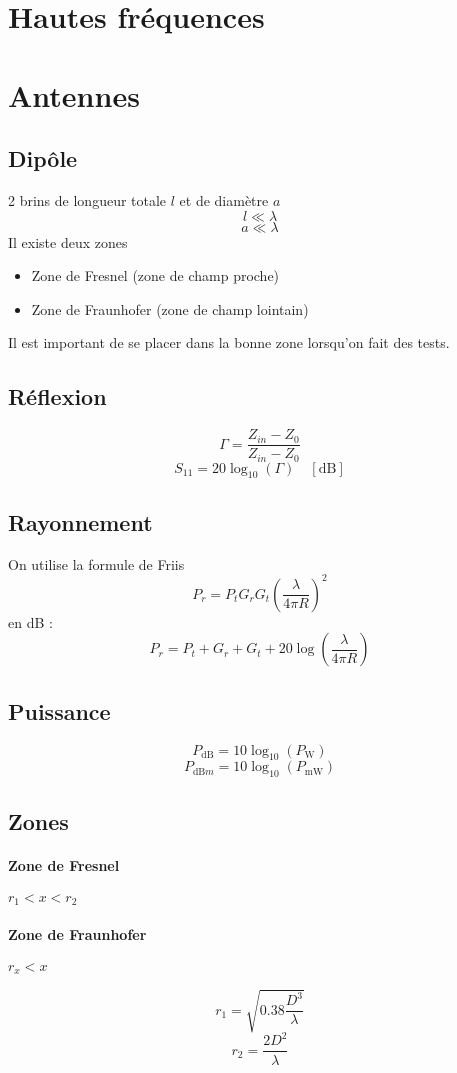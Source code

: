 \documentclass[resume]{subfiles}
\begin{document}
\section{Hautes fréquences}
\section{Antennes}
\subsection{Dipôle}
2 brins de longueur totale $l$ et de diamètre $a$
$$l\ll \lambda$$
$$a\ll\lambda$$
Il existe deux zones
\begin{itemize}
\item Zone de Fresnel (zone de champ proche)
\item Zone de Fraunhofer (zone de champ lointain)
\end{itemize}
Il est important de se placer dans la bonne zone lorsqu'on fait des tests.
\subsection{Réflexion}
$$\Gamma=\frac{Z_{in}-Z_0}{Z_{in}-Z_0}$$
$$S_{11}=20\log_{10}(\Gamma)\quad [\si{\deci\bel}]$$
\subsection{Rayonnement}
On utilise la formule de Friis
$$P_r=P_tG_rG_t\left(\frac{\lambda}{4\pi R}\right)^2$$
en dB :
$$P_r=P_t+G_r+G_t+20\log\left(\frac{\lambda}{4\pi R}\right)$$
\subsection{Puissance}
$$\boxed{P_{\si{\deci\bel}}=10\log_{10}\left(P_{\si{\watt}}\right)}$$
$$\boxed{P_{\si{\deci\bel m}}=10\log_{10}\left(P_{\si{\milli\watt}}\right)}$$
\subsection{Zones}
\paragraph{Zone de Fresnel} $r_1 < x < r_2$
\paragraph{Zone de Fraunhofer} $ r_x < x$

$$r_1=\sqrt{0.38\frac{D^3}{\lambda}}$$
$$r_2=\frac{2D^2}{\lambda}$$
\end{document}
